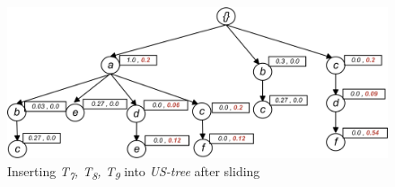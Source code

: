 %
%
\begin{figure}
  \centering
	\includegraphics[width=.8\textwidth]{images/sim_789.jpg}  
	\caption{Inserting \emph{T\textsubscript{7}, T\textsubscript{8}, T\textsubscript{9}} into \emph{US-tree} after sliding}
	\label{figure:w2}
\end{figure}
%